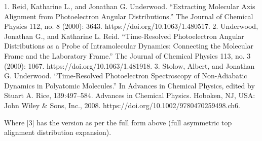 1. Reid, Katharine L., and Jonathan G. Underwood. “Extracting Molecular Axis Alignment from Photoelectron Angular Distributions.” The Journal of Chemical Physics 112, no. 8 (2000): 3643. https://doi.org/10.1063/1.480517.
2. Underwood, Jonathan G., and Katharine L. Reid. “Time-Resolved Photoelectron Angular Distributions as a Probe of Intramolecular Dynamics: Connecting the Molecular Frame and the Laboratory Frame.” The Journal of Chemical Physics 113, no. 3 (2000): 1067. https://doi.org/10.1063/1.481918.
3. Stolow, Albert, and Jonathan G. Underwood. “Time-Resolved Photoelectron Spectroscopy of Non-Adiabatic Dynamics in Polyatomic Molecules.” In Advances in Chemical Physics, edited by Stuart A. Rice, 139:497–584. Advances in Chemical Physics. Hoboken, NJ, USA: John Wiley & Sons, Inc., 2008. https://doi.org/10.1002/9780470259498.ch6.


Where [3] has the version as per the full form above (full asymmetric top alignment distribution expansion).